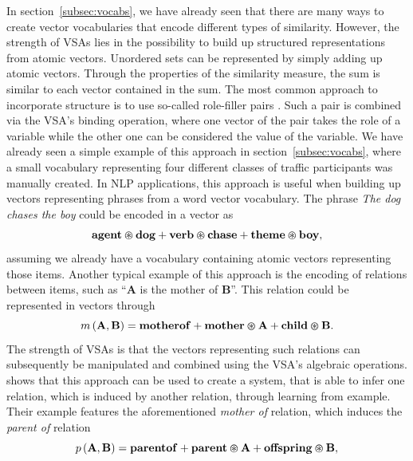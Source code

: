 In section~\ref{subsec:vocabs}, we have already seen that there are many ways to create vector vocabularies that encode different types of similarity.
However, the strength of \acp{VSA} lies in the possibility to build up structured representations from atomic vectors.
Unordered sets can be represented by simply adding up atomic vectors.
Through the properties of the similarity measure, the sum is similar to each vector contained in the sum.
The most common approach to incorporate structure is to use so-called role-filler pairs \parencite{Gayler2003}.
Such a pair is combined via the \ac{VSA}'s binding operation, where one vector of the pair takes the role of a variable while the other one can be considered the value of the variable.
We have already seen a simple example of this approach in section~\ref{subsec:vocabs}, where a small vocabulary representing four different classes of traffic participants was manually created.
In \ac{NLP} applications, this approach is useful when building up vectors representing phrases from a word vector vocabulary.
The phrase \textit{The dog chases the boy} could be encoded in a vector as
\begin{equation*}
	\mathbf{agent} \varoast \mathbf{dog} + \mathbf{verb} \varoast \mathbf{chase} + \mathbf{theme} \varoast \mathbf{boy},
\end{equation*}
assuming we already have a vocabulary containing atomic vectors representing those items.
Another typical example of this approach is the encoding of relations between items, such as \enquote{$\mathbf{A}$ is the mother of $\mathbf{B}$}.
This relation could be represented in vectors through
\begin{equation*}
	m \left(\mathbf{A}, \mathbf{B} \right) = \mathbf{motherof} + \mathbf{mother} \varoast \mathbf{A} + \mathbf{child} \varoast \mathbf{B}.
\end{equation*}
The strength of \acp{VSA} is that the vectors representing such relations can subsequently be manipulated and combined using the \ac{VSA}'s algebraic operations.
\textcite{Kanerva2000} shows that this approach can be used to create a system, that is able to infer one relation, which is induced by another relation, through learning from example.
Their example features the aforementioned \textit{mother of} relation, which induces the \textit{parent of} relation
\begin{equation*}
	p \left(\mathbf{A}, \mathbf{B} \right) = \mathbf{parentof} + \mathbf{parent} \varoast \mathbf{A} + \mathbf{offspring} \varoast \mathbf{B},
\end{equation*}

